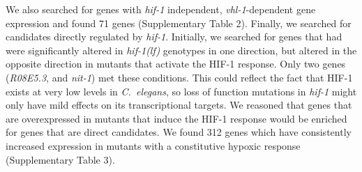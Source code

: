 \documentclass[10pt, onecolumn]{article}
\newcommand{\qval}[1]{$q<10^{-#1}$}
\newcommand{\cel}{\emph{C.~elegans}}
\newcommand{\gene}[1]{\emph{#1}}
\newcommand{\hif}{\emph{\mbox{hif-1(lf)}}}
\newcommand{\hifp}{HIF-1}
\newcommand{\vhltargets}{71} %
\newcommand{\hiftargets}{312}
\begin{document}
We also searched for genes with \gene{hif-1} independent, \gene{vhl-1}-dependent
gene expression and found \vhltargets{} genes (Supplementary Table 2). Finally,
we searched for candidates directly regulated by \gene{hif-1}. Initially, we
searched for genes that had were significantly altered in \hif{} genotypes in
one direction, but altered in the opposite direction in mutants that activate
the \hifp{} response. Only two genes (\emph{R08E5.3}, and \emph{nit-1}) met these
conditions. This could reflect the fact that \hifp{} exists at very low levels
in \cel{}, so loss of function mutations in \gene{hif-1} might only have mild
effects on its transcriptional targets. We reasoned that genes that are
overexpressed in mutants that induce the \hifp{} response would be enriched for
genes that are direct candidates. We found \hiftargets{}  genes which have
consistently increased expression in mutants with a constitutive hypoxic response
(Supplementary Table 3).

%
%
\end{document}
